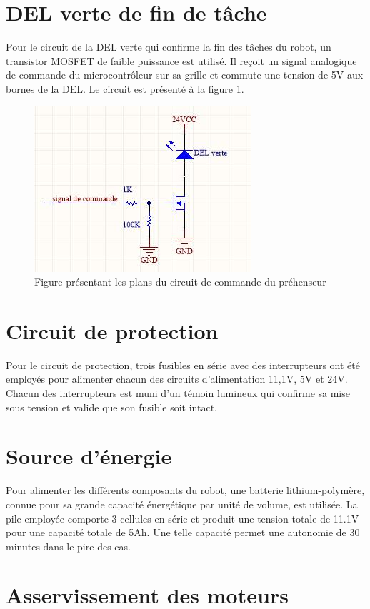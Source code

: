 \section{DEL verte de fin de tâche}
Pour le circuit de la DEL verte qui confirme la fin des tâches du robot, un transistor MOSFET de faible puissance est utilisé. Il reçoit un signal analogique de commande du microcontrôleur sur sa grille et commute une tension de 5V aux bornes de la DEL. Le circuit est présenté à la figure \ref{fig:del_verte}.

\begin{figure}[htbp]
\centering
\includegraphics[scale=0.5]{fig/del_verte.jpg}
\caption{Figure présentant les plans du circuit de commande du préhenseur}
\label{fig:del_verte}
\end{figure}

\section{Circuit de protection}
Pour le circuit de protection, trois fusibles en série avec des interrupteurs ont été employés pour alimenter chacun des circuits d’alimentation 11,1V, 5V et 24V. Chacun des interrupteurs est muni d’un témoin lumineux qui confirme sa mise sous tension et valide que son fusible soit intact.

\section{Source d'énergie}
Pour alimenter les différents composants du robot, une batterie lithium-polymère, connue pour sa grande capacité énergétique par unité de volume, est utilisée. La pile employée comporte 3 cellules en série et produit une tension totale de 11.1V pour une capacité totale de 5Ah. Une telle capacité permet une autonomie de 30 minutes dans le pire des cas.


\section{Asservissement des moteurs}
